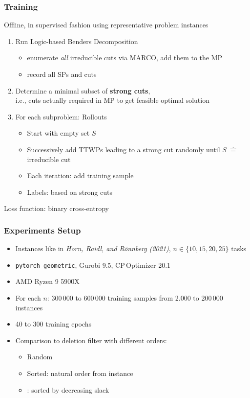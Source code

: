 \documentclass[aspectratio=1610]{beamer}
\newcommand{\important}[1]{{\color{green!60!black}#1}}
\begin{document}
\begin{frame}
	\frametitle{Training}
	Offline, in supervised fashion using representative problem instances

	\bigskip

	\medskip
	\begin{enumerate}
	\itemsep2ex
	\item \important{Run Logic-based Benders Decomposition}
		\begin{itemize}
		\item enumerate \important{\emph{all} irreducible cuts} via MARCO, add them to the MP
		\item record all SPs and cuts
		\end{itemize}
	\item Determine a minimal subset of \important{\bf strong cuts},\\
		i.e., cuts actually required in MP to get feasible optimal solution
	\item For each subproblem: \important{Rollouts}
		\begin{itemize}
		\item Start with empty set $S$
		\item Successively add TTWPs leading to a strong cut randomly until $S$ $\widehat{=}$ irreducible cut
		\item \important{Each iteration:} add \important{training sample}
		\item \important{Labels:} based on strong cuts
		\end{itemize}
	\end{enumerate}

	\bigskip
	Loss function: binary cross-entropy
\end{frame}




\begin{frame}[fragile]
	\frametitle{Experiments Setup}
	\begin{itemize}
	\item \important{Instances} like in \emph{Horn, Raidl, and Rönnberg (2021)}, $n\in\{10,15,20,25\}$ tasks
	\item \verb|pytorch_geometric|, Gurobi 9.5, CP\,Optimizer 20.1
	\item AMD Ryzen 9 5900X
	\item For each $n$: 300\,000 to 600\,000 training samples from 2.000 to 200\,000 instances
	\item 40 to 300 training epochs
	\vspace{6mm}
	\item Comparison to \important{deletion filter} with different orders:
		\begin{itemize}
		\item Random
		\item Sorted: natural order from instance
		\item \citet{2013_coban-hooker_article}: sorted by decreasing slack
		\end{itemize}
	\end{itemize}
\end{frame}
 
\end{document}
